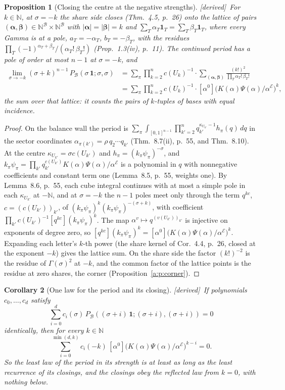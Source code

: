 \documentclass[11pt]{article}
\newcommand{\cE}{\mathcal E}
\newcommand{\cB}{\mathcal B}
\newcommand{\one}{\mathbf 1}
\newcommand{\Pc}[1]{P_{\cB}(#1\,\one;#1,#1)}
\newcommand{\Clo}[1]{[\alpha^0]\big(K(\alpha)\Psi(\alpha)/\alpha^{\cE}\big)^{#1}}
\newcommand{\Cor}{\sum_\pi\prod_{k=2}^nc(U_k)^{-1}}
\theoremstyle{plain}
\newtheorem{proposition}{Proposition}[section]
\newtheorem{corollary}[proposition]{Corollary}
\theoremstyle{definition}
\theoremstyle{remark}
\newcommand{\derived}{\textup{[derived]}}
\begin{document}
\begin{proposition}[Closing the centre at the negative strengths]\label{a:p:negcorner}\derived\
For $k\in\mathbb N$, at $\sigma=-k$ the share side closes (Thm.~4.5, p.~26) onto the lattice of pairs $(\boldsymbol\alpha,\boldsymbol\beta)\in\mathbb N^{\cB}\times\mathbb N^{\cB}$ with $|\boldsymbol\alpha|=|\boldsymbol\beta|=k$ and $\sum_T\alpha_T\one_T=\sum_T\beta_T\one_T$, where every Gamma is at a pole, $a_T=-\alpha_T$, $b_T=-\beta_T$, with the residues $\prod_T(-1)^{\alpha_T+\beta_T}/(\alpha_T!\,\beta_T!)$ (Prop.~1.3(iv), p.~11). The continued period has a pole of order at most $n-1$ at $\sigma=-k$, and
\begin{align*}
\lim_{\sigma\to-k}(\sigma+k)^{n-1}\,\Pc\sigma&=\Cor\cdot\sum_{(\boldsymbol\alpha,\boldsymbol\beta)}\frac{(k!)^2}{\prod_T\alpha_T!\,\beta_T!}\\
&=\Cor\cdot\Clo k ,
\end{align*}
the sum over that lattice: it counts the pairs of $k$-tuples of bases with equal incidence.
\end{proposition}

\begin{proof}
On the balance wall the period is $\sum_\pi\int_{[0,1]^{n-1}}\prod_{k'=2}^nq_{k'}^{\kappa_{U_{k'}}-1}h_\pi(q)\,dq$ in the sector coordinates $\alpha_{\pi(k')}=\rho\,q_2\cdots q_{k'}$ (Thm.~8.7(ii), p.~55, and Thm.~8.10). At the centre $\kappa_{U_{k'}}=\sigma c(U_{k'})$ and $h_\pi=(k_\pi\psi_\pi)^{-\sigma}$, and $k_\pi\psi_\pi=\prod_{k'}q_{k'}^{c(U_{k'})}K(\alpha)\Psi(\alpha)/\alpha^{\cE}$ is a polynomial in $q$ with nonnegative coefficients and constant term one (Lemma~8.5, p.~55, weights one). By Lemma~8.6, p.~55, each cube integral continues with at most a simple pole in each $\kappa_{U_{k'}}$ at $-\mathbb N$, and at $\sigma=-k$ the $n-1$ poles meet only through the term $q^{kc}$, $c=(c(U_{k'}))_{k'}$, of $(k_\pi\psi_\pi)^k(k_\pi\psi_\pi)^{-(\sigma+k)}$, with coefficient $\prod_{k'}c(U_{k'})^{-1}[q^{kc}](k_\pi\psi_\pi)^k$. The map $\alpha^v\mapsto q^{(v(U_{k'}))_{k'}}$ is injective on exponents of degree zero, so $[q^{kc}](k_\pi\psi_\pi)^k=\Clo k$. Expanding each letter's $k$-th power (the share kernel of Cor.~4.4, p.~26, closed at the exponent $-k$) gives the lattice sum. On the share side the factor $(k!)^{-2}$ is the residue of $\Gamma(\sigma)^2$ at $-k$, and the common factor of the lattice points is the residue at zero shares, the corner (Proposition~\ref{a:p:corner}).
\end{proof}

\begin{corollary}[One law for the period and its closing]\label{a:c:law}\derived\
If polynomials $c_0,\dots,c_d$ satisfy
\[
\sum_{i=0}^dc_i(\sigma)\,\Pc{(\sigma+i)}=0
\]
identically, then for every $k\in\mathbb N$
\[
\sum_{i=0}^{\min(d,k)}c_i(-k)\,\Clo{k-i}=0 .
\]
So the least law of the period in its strength is at least as long as the least recurrence of its closings, and the closings obey the reflected law from $k=0$, with nothing below.
\end{corollary}
\end{document}
